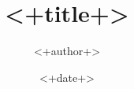 \documentclass[a4paper,fontset = windows]{ctexbook}
\begin{document}
\title{<+title+>}
\author{<+author+>}
\date{<+date+>}
\maketitle
\tableofcontents

\end{document}

